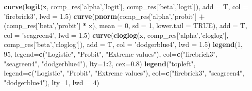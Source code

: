 \documentclass[]{article}
\newenvironment{Shaded}{\begin{snugshade}}{\end{snugshade}}
\newcommand{\DataTypeTok}[1]{\textcolor[rgb]{0.13,0.29,0.53}{#1}}
\newcommand{\DecValTok}[1]{\textcolor[rgb]{0.00,0.00,0.81}{#1}}
\newcommand{\FloatTok}[1]{\textcolor[rgb]{0.00,0.00,0.81}{#1}}
\newcommand{\KeywordTok}[1]{\textcolor[rgb]{0.13,0.29,0.53}{\textbf{#1}}}
\newcommand{\NormalTok}[1]{#1}
\newcommand{\OperatorTok}[1]{\textcolor[rgb]{0.81,0.36,0.00}{\textbf{#1}}}
\newcommand{\OtherTok}[1]{\textcolor[rgb]{0.56,0.35,0.01}{#1}}
\newcommand{\StringTok}[1]{\textcolor[rgb]{0.31,0.60,0.02}{#1}}
\begin{document}
\begin{Shaded}
\begin{Highlighting}[]
\KeywordTok{curve}\NormalTok{(}\KeywordTok{logit}\NormalTok{(x, comp_res[}\StringTok{'alpha'}\NormalTok{,}\StringTok{'logit'}\NormalTok{], comp_res[}\StringTok{'beta'}\NormalTok{,}\StringTok{'logit'}\NormalTok{]), }\DataTypeTok{add =}\NormalTok{ T, }
      \DataTypeTok{col =} \StringTok{'firebrick3'}\NormalTok{, }\DataTypeTok{lwd =} \FloatTok{1.5}\NormalTok{)}
\KeywordTok{curve}\NormalTok{(}\KeywordTok{pnorm}\NormalTok{(comp_res[}\StringTok{'alpha'}\NormalTok{,}\StringTok{'probit'}\NormalTok{] }\OperatorTok{+}\StringTok{ }\NormalTok{(comp_res[}\StringTok{'beta'}\NormalTok{,}\StringTok{'probit'}\NormalTok{] }\OperatorTok{*}\StringTok{ }\NormalTok{x), }\DataTypeTok{mean =} \DecValTok{0}\NormalTok{, }
            \DataTypeTok{sd =} \DecValTok{1}\NormalTok{, }\DataTypeTok{lower.tail =} \OtherTok{TRUE}\NormalTok{), }\DataTypeTok{add =}\NormalTok{ T, }\DataTypeTok{col =} \StringTok{'seagreen4'}\NormalTok{, }\DataTypeTok{lwd =} \FloatTok{1.5}\NormalTok{)}
\KeywordTok{curve}\NormalTok{(}\KeywordTok{cloglog}\NormalTok{(x, comp_res[}\StringTok{'alpha'}\NormalTok{,}\StringTok{'cloglog'}\NormalTok{], comp_res[}\StringTok{'beta'}\NormalTok{,}\StringTok{'cloglog'}\NormalTok{]), }\DataTypeTok{add =}\NormalTok{ T, }
      \DataTypeTok{col =} \StringTok{'dodgerblue4'}\NormalTok{, }\DataTypeTok{lwd =} \FloatTok{1.5}\NormalTok{)}
\KeywordTok{legend}\NormalTok{(}\DecValTok{1}\NormalTok{, }\DecValTok{95}\NormalTok{, }\DataTypeTok{legend=}\KeywordTok{c}\NormalTok{(}\StringTok{"Logistic"}\NormalTok{, }\StringTok{"Probit"}\NormalTok{, }\StringTok{"Extreme values"}\NormalTok{), }
       \DataTypeTok{col=}\KeywordTok{c}\NormalTok{(}\StringTok{"firebrick3"}\NormalTok{, }\StringTok{"seagreen4"}\NormalTok{, }\StringTok{"dodgerblue4"}\NormalTok{), }\DataTypeTok{lty=}\DecValTok{1}\OperatorTok{:}\DecValTok{2}\NormalTok{, }\DataTypeTok{cex=}\FloatTok{0.8}\NormalTok{)}
\KeywordTok{legend}\NormalTok{(}\StringTok{"topleft"}\NormalTok{, }\DataTypeTok{legend=}\KeywordTok{c}\NormalTok{(}\StringTok{"Logistic"}\NormalTok{, }\StringTok{"Probit"}\NormalTok{, }\StringTok{"Extreme values"}\NormalTok{), }
       \DataTypeTok{col=}\KeywordTok{c}\NormalTok{(}\StringTok{"firebrick3"}\NormalTok{, }\StringTok{"seagreen4"}\NormalTok{, }\StringTok{"dodgerblue4"}\NormalTok{),  }\DataTypeTok{lty=}\DecValTok{1}\NormalTok{, }\DataTypeTok{lwd =} \DecValTok{4}\NormalTok{)}
\end{Highlighting}
\end{Shaded}
\end{document}
